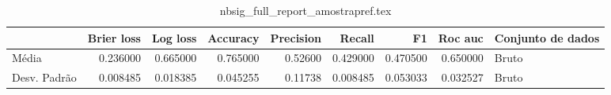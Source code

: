 \begin{table}
\centering
\caption{nbsig_full_report_amostrapref.tex}
\label{nbsig_full_report_amostrapref.tex}
\begin{tabular}{lrrrrrrrl}
\toprule
{} &  Brier  loss &  Log loss &  Accuracy  &  Precision  &   Recall  &       F1  &  Roc auc  & Conjunto de dados \\
\midrule
Média        &     0.236000 &  0.665000 &   0.765000 &     0.52600 &  0.429000 &  0.470500 &  0.650000 &             Bruto \\
Desv. Padrão &     0.008485 &  0.018385 &   0.045255 &     0.11738 &  0.008485 &  0.053033 &  0.032527 &             Bruto \\
\bottomrule
\end{tabular}
\end{table}

